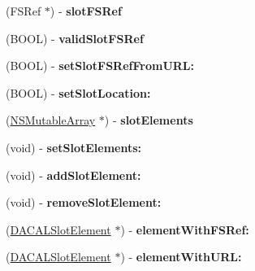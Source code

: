 \begin{DoxyCompactItemize}
\item 
\hypertarget{interface_d_a_c_a_l_slot_a660d17804796320de4486e10c4102b63}{
(FSRef $\ast$) -\/ {\bfseries slotFSRef}}
\label{interface_d_a_c_a_l_slot_a660d17804796320de4486e10c4102b63}

\item 
\hypertarget{interface_d_a_c_a_l_slot_a6923e35dbade9934ad2550b20baea357}{
(BOOL) -\/ {\bfseries validSlotFSRef}}
\label{interface_d_a_c_a_l_slot_a6923e35dbade9934ad2550b20baea357}

\item 
\hypertarget{interface_d_a_c_a_l_slot_a03587e90e0f587cef833a2cc6bb8f89c}{
(BOOL) -\/ {\bfseries setSlotFSRefFromURL:}}
\label{interface_d_a_c_a_l_slot_a03587e90e0f587cef833a2cc6bb8f89c}

\item 
\hypertarget{interface_d_a_c_a_l_slot_a3cde00c9e81b8465557a730073b86b2e}{
(BOOL) -\/ {\bfseries setSlotLocation:}}
\label{interface_d_a_c_a_l_slot_a3cde00c9e81b8465557a730073b86b2e}

\item 
\hypertarget{interface_d_a_c_a_l_slot_a0af1e99ef71a68cc4544ef80ac702199}{
(\hyperlink{class_n_s_mutable_array}{NSMutableArray} $\ast$) -\/ {\bfseries slotElements}}
\label{interface_d_a_c_a_l_slot_a0af1e99ef71a68cc4544ef80ac702199}

\item 
\hypertarget{interface_d_a_c_a_l_slot_a3136ffeeb3bc0243dcb3e137abe6ca86}{
(void) -\/ {\bfseries setSlotElements:}}
\label{interface_d_a_c_a_l_slot_a3136ffeeb3bc0243dcb3e137abe6ca86}

\item 
\hypertarget{interface_d_a_c_a_l_slot_a47cfe63472351bea5b32aa958e144a46}{
(void) -\/ {\bfseries addSlotElement:}}
\label{interface_d_a_c_a_l_slot_a47cfe63472351bea5b32aa958e144a46}

\item 
\hypertarget{interface_d_a_c_a_l_slot_a2cd881ccae8e8459f2cc38ef70a80707}{
(void) -\/ {\bfseries removeSlotElement:}}
\label{interface_d_a_c_a_l_slot_a2cd881ccae8e8459f2cc38ef70a80707}

\item 
\hypertarget{interface_d_a_c_a_l_slot_a116ec424151811f73916f5a12ad7a3cf}{
(\hyperlink{interface_d_a_c_a_l_slot_element}{DACALSlotElement} $\ast$) -\/ {\bfseries elementWithFSRef:}}
\label{interface_d_a_c_a_l_slot_a116ec424151811f73916f5a12ad7a3cf}

\item 
\hypertarget{interface_d_a_c_a_l_slot_a02131c7c03a9a5a8a62fc6634e41ca26}{
(\hyperlink{interface_d_a_c_a_l_slot_element}{DACALSlotElement} $\ast$) -\/ {\bfseries elementWithURL:}}
\label{interface_d_a_c_a_l_slot_a02131c7c03a9a5a8a62fc6634e41ca26}


\end{DoxyCompactItemize}

